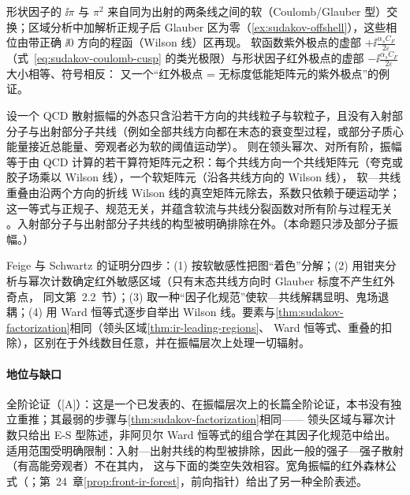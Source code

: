 形状因子的 $\ii\pi$ 与 $\pi^2$ 来自同为出射的两条线之间的软（Coulomb/Glauber 型）交换；区域分析中加解析正规子后 Glauber 区为零（\cref{ex:sudakov-offshell}），这些相位由带正确 $\ii0$ 方向的程函（Wilson 线）区再现。
软函数紫外极点的虚部 $+\ii\frac{\alpha_sC_F}{2\varepsilon}$（式~\eqref{eq:sudakov-coulomb-cusp} 的类光极限）与形状因子红外极点的虚部 $-\ii\frac{\alpha_sC_F}{2\varepsilon}$ 大小相等、符号相反：
又一个“红外极点 = 无标度低能矩阵元的紫外极点”的例证。%

\begin{proposition}\label{prop:sudakov-amplitude-factorization}
设一个 QCD 散射振幅的外态只含沿若干方向的共线粒子与软粒子，且没有入射部分子与出射部分子共线（例如全部共线方向都在末态的衰变型过程，或部分子质心能量接近总能量、旁观者必为软的阈值运动学）。
则在领头幂次、对所有阶，振幅等于由 QCD 计算的若干算符矩阵元之积：每个共线方向一个共线矩阵元（夸克或胶子场乘以 Wilson 线），一个软矩阵元（沿各共线方向的 Wilson 线），
软—共线重叠由沿两个方向的折线 Wilson 线的真空矩阵元除去，系数只依赖于硬运动学；这一等式与正规子、规范无关，并蕴含软流与共线分裂函数对所有阶与过程无关
\cite{FeigeSchwartz2014,Feige:2013zla}。入射部分子与出射部分子共线的构型被明确排除在外\cite[第~2.2、10、11.2~节]{FeigeSchwartz2014}。（本命题只涉及部分子振幅。）
\end{proposition}

\begin{proofsketch}
Feige 与 Schwartz 的证明分四步\cite[第~5--9~节]{FeigeSchwartz2014}：(1) 按软敏感性把图“着色”分解；(2) 用钳夹分析与幂次计数确定红外敏感区域（只有末态共线方向时 Glauber 标度不产生红外奇点，
同文第~2.2~节）；(3) 取一种“因子化规范”使软—共线解耦显明、鬼场退耦；(4) 用 Ward 恒等式逐步自举出 Wilson 线。要素与\cref{thm:sudakov-factorization}相同（领头区域\cref{thm:ir-leading-regions}、
Ward 恒等式、重叠的扣除），区别在于外线数目任意，并在振幅层次上处理一切辐射。
\end{proofsketch}

\paragraph{地位与缺口}全阶论证（[A]）：这是一个已发表的、在振幅层次上的长篇全阶论证，本书没有独立重推；其最弱的步骤与\cref{thm:sudakov-factorization}相同——
领头区域与幂次计数只给出 E-S 型陈述，非阿贝尔 Ward 恒等式的组合学在其因子化规范中给出。适用范围受明确限制：入射—出射共线的构型被排除，因此一般的强子—强子散射（有高能旁观者）不在其内，
这与下面的类空失效相容。宽角振幅的红外森林公式（\cite{Ma2020}；第~24~章\cref{prop:front-ir-forest}，前向指针）给出了另一种全阶表述。

